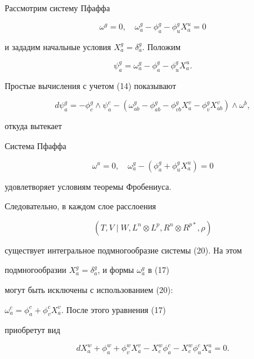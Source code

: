 Рассмотрим систему Пфаффа


$$


\omega^g = 0,\quad \omega^g_a - \phi^g_a - \phi^g_u X^u_a = 0


$$


и зададим начальные условия $X^g_a = \delta^g_a$. Положим


$$


\psi^g_a = \omega^g_a - \phi^g_a - \phi^g_u X^u_a.


$$


Простые вычисления с учетом (14) показывают


\begin{equation}


d\psi^g_a = - \phi^g_c \wedge \psi^c_a - (\omega^g_{ab} - \phi^g_{ab} -


\phi^g_{vb} X^v_a - \phi^g_v X^v_{ab}) \wedge \omega^b,


\end{equation}


откуда вытекает





\begin{thm} Система Пфаффа


\begin{equation}


\omega^a = 0,\quad \omega^g_a - (\phi^g_a + \phi^g_u X^u_a) = 0


\end{equation}


удовлетворяет условиям теоремы Фробениуса.


\end{thm}





Следовательно, в каждом слое расслоения


$$


(T, V \mid W, L^n \otimes L^p, R^n \otimes R^{p*}, \rho)


$$


существует интегральное подмногообразие системы (20). На этом


подмногообразии $X^g_a = \delta^g_a$, и формы $\omega^g_a$ в (17)


могут быть исключены с использованием (20):


$\omega^c_a = \phi^c_a + \phi^c_v X^v_a$. После этого уравнения (17)


приобретут вид


\begin{equation}


dX^w_a + \phi^w_a + \phi^w_v X^v_a - X^w_c \phi^c_a -


X^w_c \phi^c_u X^u_a = 0.


\end{equation}





